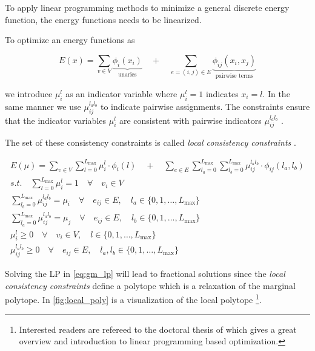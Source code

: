 To apply linear programming methods to minimize a general discrete energy function, 
the energy functions
needs to be linearized.

To optimize an energy functions as 

\begin{equation} \label{eq:gm_nl_energy}
    E(x) = 
     \sum_{v \in V}
    \underbrace{
        \phi_i(x_i)
    }_{\text{unaries}}
     \quad +  \quad
     \sum_{e=(i,j) \in E } 
    \underbrace{
        \phi_{ij}(x_i,x_j) 
    }_{\text{pairwise terms}}
\end{equation}

we introduce $\mu_{i}^{l}$ as an indicator variable where $\mu_{i}^{l}=1$ indicates $x_i=l$.
In the same manner we use $\mu_{ij}^{l_a l_b}$ to indicate pairwise 
assignments.
The constraints ensure that the indicator variables $\mu_{i}^{l}$ are consistent 
with pairwise indicators $\mu_{ij}^{l_a l_b}$ .

The set of these consistency constraints is 
called \emph{local consistency constraints} \citep{sontag_2010_thesis}.

\begin{align}
    E(\mu) = \sum_{v \in V} \sum_{l=0}^{L_{\text{max}}} \label{eq:gm_lp}
    \mu_{i}^{l} \cdot \phi_{i}( l)
    \quad +  \quad
    \sum_{e \in E} \sum_{l_a=0}^{L_{\text{max}}} \sum_{l_b=0}^{L_{\text{max}}}
    \mu_{ij}^{l_a l_b} \cdot \phi_{ij}( l_a,l_b) \\
    s.t. \quad
    \sum_{l=0}^{L_{\text{max}}} \mu_{i}^{l} = 1 \quad \forall \quad v_i \in V \\
    \sum_{l_b=0}^{L_{\text{max}}} \mu_{ij}^{l_a l_b} = \mu_i 
    \quad \forall \quad e_{ij} \in E, 
    \quad l_a \in \{ 0,1,\ldots,L_{\text{max}} \} \\ 
    \sum_{l_a=0}^{L_{\text{max}}} \mu_{ij}^{l_a l_b} = \mu_j 
    \quad \forall \quad e_{ij} \in E, 
    \quad l_b \in \{ 0,1,\ldots,L_{\text{max}} \} \\ 
    \mu_i^l \geq 0 \quad \forall \quad v_{i} \in V,
    \quad l \in \{ 0,1,\ldots,L_{\text{max}} \}\\
    \mu_{ij}^{l_a l_b} \geq 0 \quad \forall \quad e_{ij} \in E,
    \quad l_a,l_b \in \{ 0,1,\ldots,L_{\text{max}} \}
\end{align}

Solving the LP in \cref{eq:gm_lp} will lead to fractional
solutions since the \emph{local consistency constraints} 
define a polytope which is a relaxation
of the marginal polytope.
In \cref{fig:local_poly} is a visualization of the local
polytope \footnote{
Interested readers are refereed to the doctoral
thesis of  \citet{sontag_2010_thesis} which gives
a great overview and introduction to linear programming
based optimization.
}.

